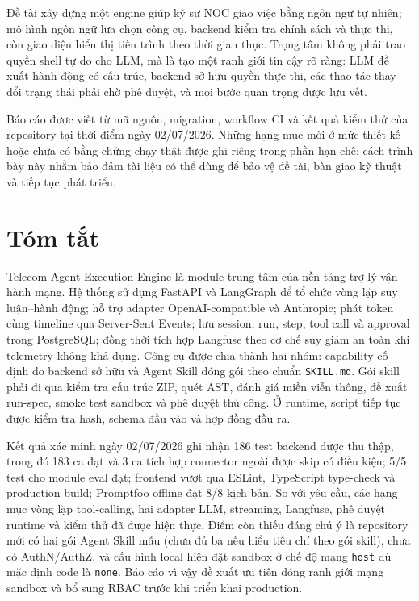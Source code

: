 \documentclass[12pt,a4paper]{article}
\begin{document}
Đề tài xây dựng một engine giúp kỹ sư NOC giao việc bằng ngôn ngữ tự nhiên; mô hình ngôn ngữ lựa chọn công cụ, backend kiểm tra chính sách và thực thi, còn giao diện hiển thị tiến trình theo thời gian thực. Trọng tâm không phải trao quyền shell tự do cho LLM, mà là tạo một ranh giới tin cậy rõ ràng: LLM đề xuất hành động có cấu trúc, backend sở hữu quyền thực thi, các thao tác thay đổi trạng thái phải chờ phê duyệt, và mọi bước quan trọng được lưu vết.

Báo cáo được viết từ mã nguồn, migration, workflow CI và kết quả kiểm thử của repository tại thời điểm ngày 02/07/2026. Những hạng mục mới ở mức thiết kế hoặc chưa có bằng chứng chạy thật được ghi riêng trong phần hạn chế; cách trình bày này nhằm bảo đảm tài liệu có thể dùng để bảo vệ đề tài, bàn giao kỹ thuật và tiếp tục phát triển.

\section*{Tóm tắt}
Telecom Agent Execution Engine là module trung tâm của nền tảng trợ lý vận hành mạng. Hệ thống sử dụng FastAPI và LangGraph để tổ chức vòng lặp suy luận--hành động; hỗ trợ adapter OpenAI-compatible và Anthropic; phát token cùng timeline qua Server-Sent Events; lưu session, run, step, tool call và approval trong PostgreSQL; đồng thời tích hợp Langfuse theo cơ chế suy giảm an toàn khi telemetry không khả dụng. Công cụ được chia thành hai nhóm: capability cố định do backend sở hữu và Agent Skill đóng gói theo chuẩn \texttt{SKILL.md}. Gói skill phải đi qua kiểm tra cấu trúc ZIP, quét AST, đánh giá miền viễn thông, đề xuất run-spec, smoke test sandbox và phê duyệt thủ công. Ở runtime, script tiếp tục được kiểm tra hash, schema đầu vào và hợp đồng đầu ra.

Kết quả xác minh ngày 02/07/2026 ghi nhận 186 test backend được thu thập, trong đó 183 ca đạt và 3 ca tích hợp connector ngoài được skip có điều kiện; 5/5 test cho module eval đạt; frontend vượt qua ESLint, TypeScript type-check và production build; Promptfoo offline đạt 8/8 kịch bản. So với yêu cầu, các hạng mục vòng lặp tool-calling, hai adapter LLM, streaming, Langfuse, phê duyệt runtime và kiểm thử đã được hiện thực. Điểm còn thiếu đáng chú ý là repository mới có hai gói Agent Skill mẫu (chưa đủ ba nếu hiểu tiêu chí theo gói skill), chưa có AuthN/AuthZ, và cấu hình local hiện đặt sandbox ở chế độ mạng \texttt{host} dù mặc định code là \texttt{none}. Báo cáo vì vậy đề xuất ưu tiên đóng ranh giới mạng sandbox và bổ sung RBAC trước khi triển khai production.
\end{document}
